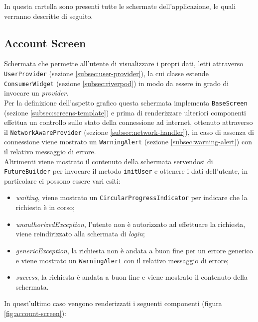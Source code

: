 In questa cartella sono presenti tutte le schermate dell'applicazione, le quali verranno descritte di seguito.

\subsection{Account Screen}
\label{subsec:account-screen}

Schermata che permette all'utente di visualizzare i propri dati, letti attraverso \lstinline{UserProvider} (sezione \ref{subsec:user-provider}), la cui classe estende \lstinline{ConsumerWidget} (sezione \ref{subsec:riverpod}) in modo da essere in grado di invocare un \emph{provider}. \\
Per la definizione dell'aspetto grafico questa schermata implementa \lstinline{BaseScreen} (sezione \ref{subsec:screens-template}) e prima di renderizzare ulteriori componenti effettua un controllo sullo stato della connessione ad internet, ottenuto attraverso il \lstinline{NetworkAwareProvider} (sezione \ref{subsec:network-handler}), in caso di assenza di connessione viene mostrato un \lstinline{WarningAlert} (sezione \ref{subsec:warning-alert}) con il relativo messaggio di errore. \\
Altrimenti viene mostrato il contenuto della schermata servendosi di \lstinline{FutureBuilder}\cite{site:future-builder} per invocare il metodo \lstinline{initUser} e ottenere i dati dell'utente, in particolare ci possono essere vari esiti:
\begin{itemize}
    \item \emph{waiting}, viene mostrato un \lstinline{CircularProgressIndicator}\cite{site:circular-progress-indicator} per indicare che la richiesta è in corso;
    \item \emph{unauthorizedException}, l'utente non è autorizzato ad effettuare la richiesta, viene reindirizzato alla schermata di \emph{login};
    \item \emph{genericException}, la richiesta non è andata a buon fine per un errore generico e viene mostrato un \lstinline{WarningAlert} con il relativo messaggio di errore;
    \item \emph{success}, la richiesta è andata a buon fine e viene mostrato il contenuto della schermata.
\end{itemize}
In quest'ultimo caso vengono renderizzati i seguenti componenti (figura \ref{fig:account-screen}):
